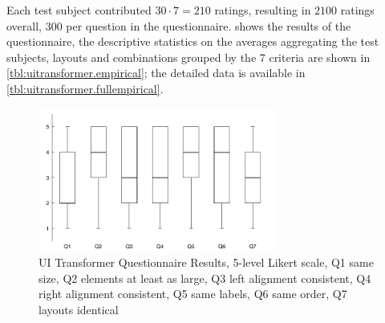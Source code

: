 Each test subject contributed \(30 \cdot 7 = 210\) ratings, resulting in \(2100\) ratings overall, \(300\) per question in the questionnaire.
 shows the results of the questionnaire, the descriptive statistics on the averages aggregating the test subjects, layouts and combinations grouped by the 7 criteria are shown in \cref{tbl:uitransformer.empirical}; the detailed data is available in \cref{tbl:uitransformer.fullempirical}.
\begin{figure}[h!]
\hypertarget{fig:uitransformer.boxplot}{%
\centering
\includegraphics[width=0.7\textwidth]{../figures/boxplots/uitransformer-boxplot.pdf}
\caption[UI Transformer Questionnaire Results]{UI Transformer Questionnaire Results, 5-level Likert scale, Q1 same size, Q2 elements at least as large, Q3 left alignment consistent, Q4 right alignment consistent, Q5 same labels, Q6 same order, Q7 layouts identical}\label{fig:uitransformer.boxplot}
}
\end{figure}

